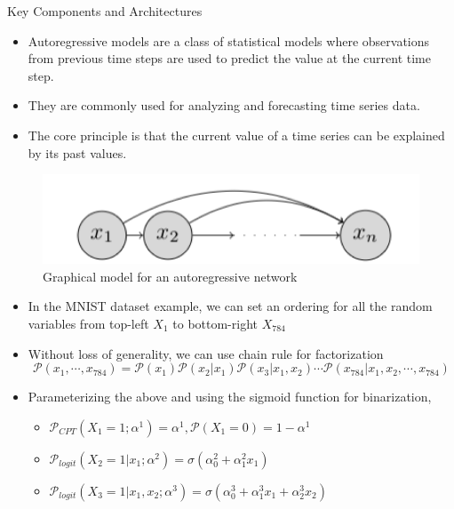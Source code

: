 \begin{frame}[allowframebreaks]{Key Components and Architectures}
    \begin{itemize}
        \item Autoregressive models are a class of statistical models where observations from previous time steps are used to predict the value at the current time step.
        \item They are commonly used for analyzing and forecasting time series data.
        \item The core principle is that the current value of a time series can be explained by its past values.
    \end{itemize}

    \begin{figure}
    \centering
    \includegraphics[height=0.5\textheight, width=\textwidth, keepaspectratio]{images/arm/autoregressive.png}
    \caption{Graphical model for an autoregressive network}
\end{figure}

\framebreak

\begin{itemize}
    \item In the MNIST dataset example, we can set an ordering for all the random variables from top-left $X_1$ to bottom-right $X_{784}$
    \item Without loss of generality, we can use chain rule for factorization
    $$\mathcal{P}(x_1, \cdots, x_{784}) = \mathcal{P}(x_1) \mathcal{P}(x_2|x_1) \mathcal{P}(x_3|x_1, x_2) \cdots \mathcal{P}(x_{784}|x_1, x_2, \cdots, x_{784})$$
    \item Parameterizing the above and using the sigmoid function for binarization,
    \begin{itemize}
        \item $\mathcal{P}_{CPT}(X_1=1;\alpha^1) = \alpha^1, \mathcal{P}(X_1=0) = 1-\alpha^1$
        \item $\mathcal{P}_{logit}(X_2=1|x_1;\alpha^2) = \sigma (\alpha_0^2 + \alpha_1^2 x_1)$
        \item $\mathcal{P}_{logit}(X_3=1|x_1,x_2;\alpha^3) = \sigma (\alpha_0^3 + \alpha_1^3 x_1 + \alpha_2^3 x_2)$
    \end{itemize}
\end{itemize}
\end{frame}